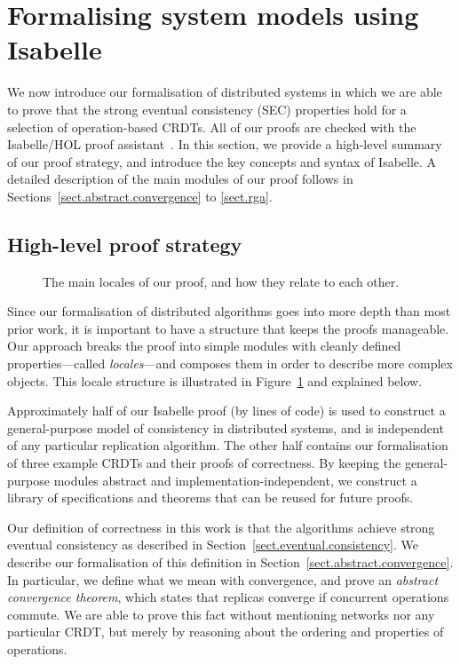 \section{Formalising system models using Isabelle}
\label{sect.isabelle}

We now introduce our formalisation of distributed systems in which we are able to prove that the strong eventual consistency (SEC) properties hold for a selection of operation-based CRDTs.
All of our proofs are checked with the Isabelle/HOL proof assistant~\cite{DBLP:conf/tphol/WenzelPN08}.
In this section, we provide a high-level summary of our proof strategy, and introduce the key concepts and syntax of Isabelle.
A detailed description of the main modules of our proof follows in Sections~\ref{sect.abstract.convergence} to \ref{sect.rga}.

\subsection{High-level proof strategy}
\label{sect.high-level.proof.strategy}

\begin{figure}
\centering

\caption{The main locales of our proof, and how they relate to each other.}\label{fig.proof.structure}
\end{figure}

Since our formalisation of distributed algorithms goes into more depth than most prior work, it is important to have a structure that keeps the proofs manageable.
Our approach breaks the proof into simple modules with cleanly defined properties---called \emph{locales}---and composes them in order to describe more complex objects.
This locale structure is illustrated in Figure~\ref{fig.proof.structure} and explained below.

Approximately half of our Isabelle proof (by lines of code) is used to construct a general-purpose model of consistency in distributed systems, and is independent of any particular replication algorithm.
The other half contains our formalisation of three example CRDTs and their proofs of correctness.
By keeping the general-purpose modules abstract and implementation-independent, we construct a library of specifications and theorems that can be reused for future proofs.

Our definition of correctness in this work is that the algorithms achieve strong eventual consistency as described in Section~\ref{sect.eventual.consistency}.
We describe our formalisation of this definition in Section~\ref{sect.abstract.convergence}.
In particular, we define what we mean with convergence, and prove an \emph{abstract convergence theorem}, which states that replicas converge if concurrent operations commute.
We are able to prove this fact without mentioning networks nor any particular CRDT, but merely by reasoning about the ordering and properties of operations.

